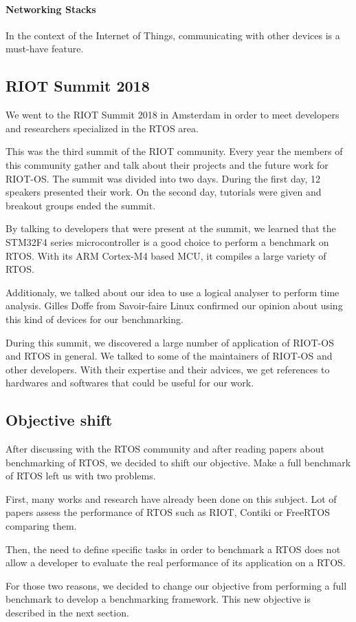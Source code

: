 \paragraph{Networking Stacks}
In the context of the Internet of Things, communicating with other devices is a must-have feature.

\subsection{RIOT Summit 2018}
We went to the RIOT Summit 2018 in Amsterdam in order to meet developers and researchers specialized in the RTOS area.

This was the third summit of the RIOT community.
Every year the members of this community gather and talk about their projects and the future work for RIOT-OS.
The summit was divided into two days. During the first day, 12 speakers presented their work. On the second day, tutorials were given and breakout groups ended the summit.

By talking to developers that were present at the summit, we learned that the STM32F4 series microcontroller is a good choice to perform a benchmark on RTOS. With its ARM Cortex-M4 based MCU, it compiles a large variety of RTOS.

Additionaly, we talked about our idea to use a logical analyser to perform time analysis. Gilles Doffe from Savoir-faire Linux confirmed our opinion about using this kind of devices for our benchmarking.

During this summit, we discovered a large number of application of RIOT-OS and RTOS in general.
We talked to some of the maintainers of RIOT-OS and other developers. With their expertise and their advices, we get references to hardwares and softwares that could be useful for our work.

\subsection{Objective shift}

After discussing with the RTOS community and after reading papers about benchmarking of RTOS, we decided to shift our objective.
Make a full benchmark of RTOS left us with two problems.

First, many works and research have already been done on this subject.
Lot of papers assess the performance of RTOS such as RIOT, Contiki or FreeRTOS comparing them.

Then, the need to define specific tasks in order to benchmark a RTOS does not allow a developer to evaluate the real performance of its application on a RTOS.

For those two reasons, we decided to change our objective from performing a full benchmark to develop a benchmarking framework.
This new objective is described in the next section.